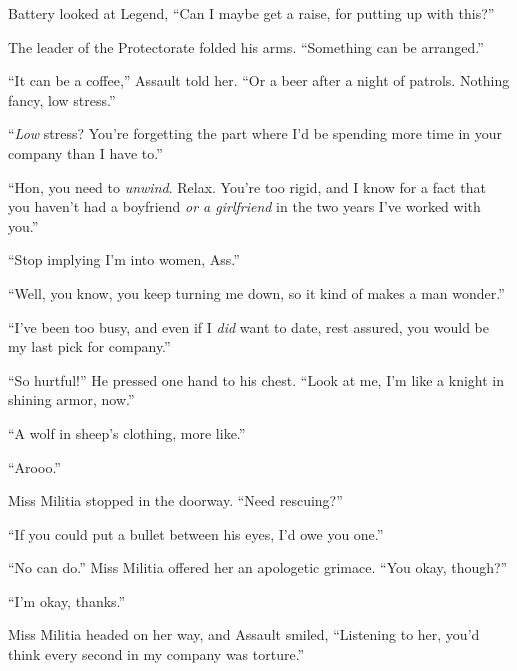 Battery looked at Legend, ``Can I maybe get a raise, for putting up with this?''



The leader of the Protectorate folded his arms.  ``Something can be arranged.''



\sectionbreak



``It can be a coffee,'' Assault told her.  ``Or a beer after a night of patrols.  Nothing fancy, low stress.''



``\emph{Low} stress?  You're forgetting the part where I'd be spending more time in your company than I have to.''



``Hon, you need to \emph{unwind}.  Relax.  You're too rigid, and I know for a fact that you haven't had a boyfriend \emph{or a girlfriend} in the two years I've worked with you.''



``Stop implying I'm into women, Ass.''



``Well, you know, you keep turning me down, so it kind of makes a man wonder.''



``I've been too busy, and even if I \emph{did} want to date, rest assured, you would be my last pick for company.''



``So hurtful!''  He pressed one hand to his chest.  ``Look at me, I'm like a knight in shining armor, now.''



``A wolf in sheep's clothing, more like.''



``Arooo.''



Miss Militia stopped in the doorway.  ``Need rescuing?''



``If you could put a bullet between his eyes, I'd owe you one.''



``No can do.''  Miss Militia offered her an apologetic grimace.  ``You okay, though?''



``I'm okay, thanks.''



Miss Militia headed on her way, and Assault smiled, ``Listening to her, you'd think every second in my company was torture.''



